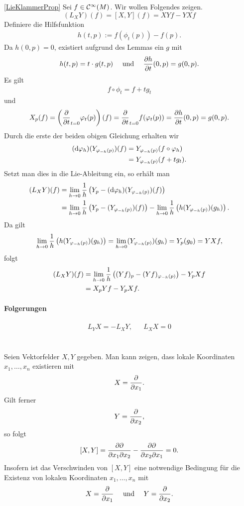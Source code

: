 \begin{Beweis}{\ref{LieKlammerProp}}
	Sei $f \in \mathcal{C}^{\infty}(M)$. Wir wollen Folgendes zeigen.
	\[ (L_XY)(f) = [X,Y](f) = XYf - YXf \]
	Definiere die Hilfsfunktion
	\begin{align*}
	h(t,p) := f(\phi_t(p)) - f(p).
	\end{align*}
	Da $h(0,p) = 0$, existiert aufgrund des Lemmas ein $g$ mit
	\begin{align*}
	h(t,p) = t \cdot g(t,p) &&\text{ und }&& \frac{\partial h}{\partial t}(0,p) = g(0,p).
	\end{align*}
	Es gilt
	\begin{align*}
	f \circ \phi_t = f + t g_t
	\end{align*}
	und
	\begin{align*}
	X_p(f) = \left(\frac{\partial }{\partial t}_{t= 0}\varphi_t(p)\right)(f) = \frac{\partial }{\partial t}_{t = 0} f(\varphi_t(p)) = \frac{\partial h}{\partial t} (0,p) = g(0,p).
	\end{align*}
	Durch die erste der beiden obigen Gleichung erhalten wir
	\begin{align*}
	(\text{d} \varphi_h)(Y_{\varphi_{-h}(p)})(f) &= Y_{\varphi_{-h}(p)}(f\circ \varphi_h)\\
	&= Y_{\varphi_{-h}(p)} (f+tg_t).
	\end{align*}
	Setzt man dies in die Lie-Ableitung ein, so erhält man
	\begin{align*}
	(L_XY)(f) &= \lim\limits_{h\overset{}{\rightarrow} 0}\frac{1}{h}\left( Y_p - (\text{d} \varphi_h)(Y_{\varphi_{-h}(p)})(f) \right)\\
	&= \lim\limits_{h\overset{}{\rightarrow} 0}\frac{1}{h}\left( Y_p - (Y_{\varphi_{-h}(p)})(f) \right) - \lim\limits_{h\overset{}{\rightarrow} 0}\frac{1}{h}\left(h (Y_{\varphi_{-h}(p)})(g_h) \right).
	\end{align*}
	Da gilt
	\[ \lim\limits_{h\overset{}{\rightarrow} 0}\frac{1}{h}\left(h (Y_{\varphi_{-h}(p)})(g_h) \right) =
	\lim\limits_{h\overset{}{\rightarrow} 0} (Y_{\varphi_{-h}(p)})(g_h)  = Y_p(g_0) =YXf,  \]
	folgt
		\begin{align*}
	(L_XY)(f)&= \lim\limits_{h\overset{}{\rightarrow} 0}\frac{1}{h}\left( (Yf)_p - (Yf)_{\varphi_{-h}(p)} \right) - Y_pXf\\
	&= X_pYf - Y_pXf.
	\end{align*}
\end{Beweis}
\paragraph{Folgerungen}
\begin{align*}
L_YX = -L_XY, && L_XX = 0
\end{align*}\\\\
Seien Vektorfelder $X,Y$ gegeben. Man kann zeigen, dass lokale Koordinaten $x_1,\ldots, x_n$ existieren mit
\[ X = \frac{\partial }{\partial x_1}. \]
Gilt ferner
\[ Y = \frac{\partial }{\partial x_2}, \]
so folgt
\[ [X,Y] = \frac{\partial \partial}{\partial x_1\partial x_2} - \frac{\partial \partial}{\partial x_2\partial x_1} = 0.  \]
Insofern ist das Verschwinden von $[X,Y]$ eine notwendige Bedingung für die Existenz von lokalen Koordinaten $x_1,\ldots, x_n$ mit
\begin{align*}
X = \frac{\partial }{\partial x_1} && \text{ und } && Y = \frac{\partial }{\partial x_2}.
\end{align*}

